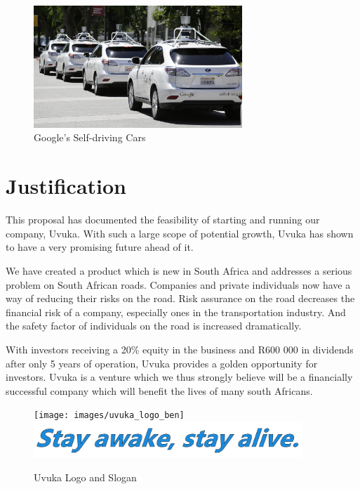 \begin{figure}[H]
\centering
\includegraphics[width=0.7\textwidth]{images/Google_Cars}
\vskip10pt
\caption[Google's Self-driving Cars]{Google's Self-driving Cars \cite{googlecars}}
\label{fig:gcars}
\end{figure}

\newpage
\chapter{Justification}
This proposal has documented the feasibility of starting and running our company, Uvuka. With such a large scope of potential growth, Uvuka has shown to have a very promising future ahead of it.

We have created a product which is new in South Africa and addresses a serious problem on South African roads. Companies and private individuals now have a way of reducing their risks on the road. Risk assurance on the road decreases the financial risk of a company, especially ones in the transportation industry. And the safety factor of individuals on the road is increased dramatically.

With investors receiving a 20\% equity in the business and R600 000 in dividends after only 5 years of operation, Uvuka provides a golden opportunity for investors. Uvuka is a venture which we thus strongly believe will be a financially successful company which will benefit the lives of many south Africans.

\vskip50pt

\begin{figure}[H]
\centering
\texttt{[image: images/uvuka\_logo\_ben]}
\includegraphics[width=0.9\textwidth]{Uvuka_Slogan.PNG}
\vskip10pt
\caption[Uvuka Logo and Slogan]{Uvuka Logo and Slogan}
\label{fig:Uvuka_slogan}
\end{figure}



